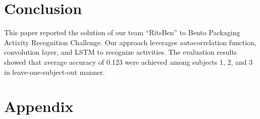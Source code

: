 \documentclass[graybox]{svmult}
\begin{document}
\section{Conclusion}
\label{sec:conclusion}
This paper reported the solution of our team ``RitsBen'' to Bento Packaging Activity Recognition Challenge. Our approach leverages autocorrelation function, convolution layer, and LSTM to recognize activities. The evaluation results showed that average accuracy of 0.123 were achieved among subjects 1, 2, and 3 in leave-one-subject-out manner. %








\section*{Appendix}
\end{document}
